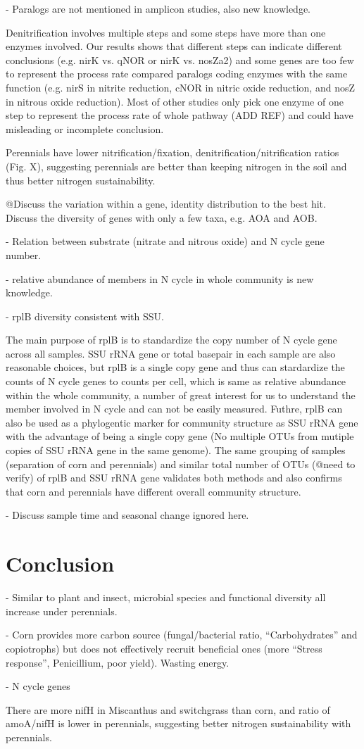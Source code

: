 \documentclass[12pt]{article}
\begin{document}
- Paralogs are not mentioned in amplicon studies, also new knowledge.

Denitrification involves multiple steps and some steps have more than one enzymes involved.  Our results shows that different steps can indicate different conclusions (e.g. nirK vs. qNOR or nirK vs. nosZa2) and some genes are too few to represent the process rate compared paralogs coding enzymes with the same function (e.g. nirS in nitrite reduction, cNOR in nitric oxide reduction, and nosZ in nitrous oxide reduction). Most of other studies only pick one enzyme of one step to represent the process rate of whole pathway (ADD REF) and could have misleading or incomplete conclusion.

Perennials have lower nitrification/fixation, denitrification/nitrification ratios (Fig. X), suggesting perennials are better than keeping nitrogen in the soil and thus better nitrogen sustainability.

@Discuss the variation within a gene, identity distribution to the best hit. Discuss the diversity of genes with only a few taxa, e.g. AOA and AOB.

- Relation between substrate (nitrate and nitrous oxide) and N cycle gene number. 

- relative abundance of members in N cycle in whole community is new knowledge.

- rplB diversity consistent with SSU. 

The main purpose of rplB is to standardize the copy number of N cycle gene across all samples. SSU rRNA gene or total basepair in each sample are also reasonable choices, but rplB is a single copy gene and thus can stardardize the counts of N cycle genes to counts per cell, which is same as relative abundance within the whole community, a number of great interest for us to understand the member involved in N cycle and can not be easily measured. Futhre, rplB can also be used as a phylogentic marker for community structure as SSU rRNA gene with the advantage of being a single copy gene (No multiple OTUs from mutiple copies of SSU rRNA gene in the same genome). The same grouping of samples (separation of corn and perennials) and similar total number of OTUs (@need to verify) of rplB and SSU rRNA gene validates both methods and also confirms that corn and perennials have different overall community structure.

- Discuss sample time and seasonal change ignored here. 

\section{Conclusion}

- Similar to plant and insect, microbial species and functional diversity all increase under perennials.

- Corn provides more carbon source (fungal/bacterial ratio, ``Carbohydrates'' and copiotrophs) but does not effectively recruit beneficial ones (more ``Stress response'', Penicillium, poor yield). Wasting energy.

- N cycle genes

There are more nifH in Miscanthus and switchgrass than corn, and ratio of amoA/nifH is lower in perennials, suggesting better nitrogen sustainability with perennials.
\end{document}

